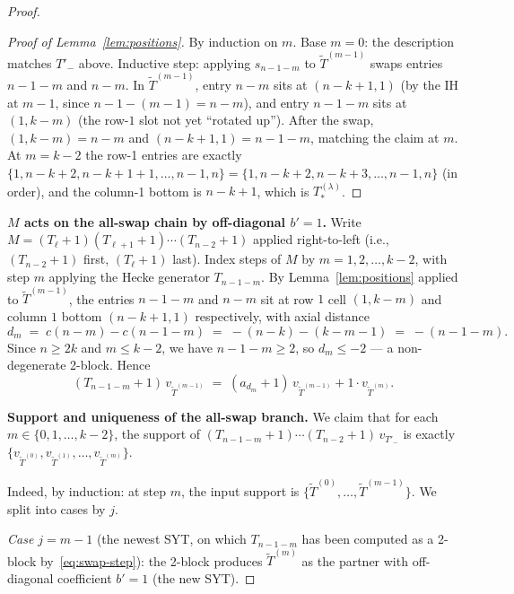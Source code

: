 \documentclass[11pt]{article}
\theoremstyle{definition}
\begin{document}
\begin{proof}
\begin{proof}[Proof of Lemma~\ref{lem:positions}]
By induction on $m$.  Base $m = 0$: the description matches $T'_-$
above.  Inductive step: applying $s_{n-1-m}$ to $\widetilde{T}^{(m-1)}$
swaps entries $n-1-m$ and $n-m$.  In $\widetilde{T}^{(m-1)}$, entry
$n-m$ sits at $(n-k+1, 1)$ (by the IH at $m - 1$, since $n - 1 - (m-1)
= n - m$), and entry $n-1-m$ sits at $(1, k - m)$ (the row-$1$ slot
not yet ``rotated up'').  After the swap, $(1, k-m) = n-m$ and
$(n-k+1, 1) = n-1-m$, matching the claim at $m$.  At $m = k-2$ the
row-1 entries are exactly $\{1, n-k+2, n-k+1+1, \ldots, n-1, n\} =
\{1, n-k+2, n-k+3, \ldots, n-1, n\}$ (in order), and the column-1
bottom is $n-k+1$, which is $T_{*}^{(\lambda)}$.
\end{proof}

\textbf{$M$ acts on the all-swap chain by off-diagonal $b' = 1$.}  Write
$M = (T_\ell{+}1)(T_{\ell+1}{+}1)\cdots(T_{n-2}{+}1)$ applied right-to-left
(i.e., $(T_{n-2}{+}1)$ first, $(T_\ell{+}1)$ last).  Index steps of $M$
by $m = 1, 2, \ldots, k-2$, with step $m$ applying the Hecke generator
$T_{n-1-m}$.  By Lemma~\ref{lem:positions} applied to
$\widetilde{T}^{(m-1)}$, the entries $n-1-m$ and $n-m$ sit at row $1$
cell $(1, k-m)$ and column $1$ bottom $(n-k+1, 1)$ respectively, with
axial distance
\[
   d_m \;=\; c(n-m) - c(n-1-m)
   \;=\; -(n-k) - (k-m-1) \;=\; -(n-1-m).
\]
Since $n \ge 2k$ and $m \le k - 2$, we have $n - 1 - m \ge 2$, so
$d_m \le -2$ — a non-degenerate 2-block.  Hence
\begin{equation}\label{eq:swap-step}
   (T_{n-1-m} + 1)\, v_{\widetilde{T}^{(m-1)}}
   \;=\; (a_{d_m} + 1)\, v_{\widetilde{T}^{(m-1)}}
       + 1 \cdot v_{\widetilde{T}^{(m)}}.
\end{equation}

\textbf{Support and uniqueness of the all-swap branch.}  We claim that
for each $m \in \{0, 1, \ldots, k-2\}$, the support of
$(T_{n-1-m}{+}1)\cdots(T_{n-2}{+}1)\, v_{T'_-}$ is exactly
$\{v_{\widetilde{T}^{(0)}}, v_{\widetilde{T}^{(1)}}, \ldots,
v_{\widetilde{T}^{(m)}}\}$.

Indeed, by induction: at step $m$, the input support is
$\{\widetilde{T}^{(0)}, \ldots, \widetilde{T}^{(m-1)}\}$.  We split
into cases by $j$.

\emph{Case $j = m - 1$} (the newest SYT, on which $T_{n-1-m}$ has been
computed as a 2-block by~\eqref{eq:swap-step}): the 2-block produces
$\widetilde{T}^{(m)}$ as the partner with off-diagonal coefficient
$b' = 1$ (the new SYT).


\end{proof}
\end{document}
